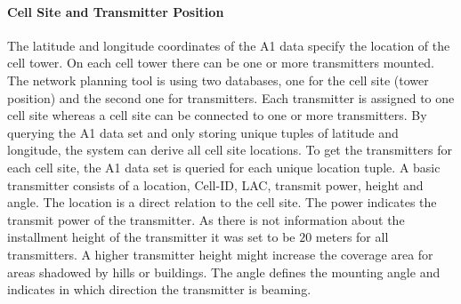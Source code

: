 \documentclass[master,english]{hgbthesis}
\begin{document}
\paragraph{Cell Site and Transmitter Position}
The latitude and longitude coordinates of the A1 data specify the location of the cell tower. On each cell tower there can be one or more transmitters mounted. The network planning tool is using two databases, one for the cell site (tower position) and the second one for transmitters. Each transmitter is assigned to one cell site whereas a cell site can be connected to one or more transmitters.
By querying the A1 data set and only storing unique tuples of latitude and longitude, the system can derive all cell site locations. To get the transmitters for each cell site, the A1 data set is queried for each unique location tuple. A basic transmitter consists of a location, Cell-ID, LAC, transmit power, height and angle. The location is a direct relation to the cell site. The power indicates the transmit power of the transmitter. As there is not information about the installment height of the transmitter it was set to be $20$ meters for all transmitters. A higher transmitter height might increase the coverage area for areas shadowed by hills or buildings. The angle defines the mounting angle and indicates in which direction the transmitter is beaming.
\end{document}
